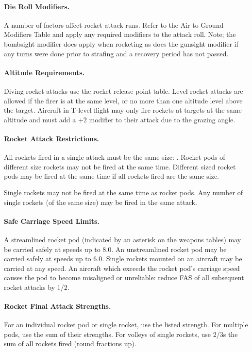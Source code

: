 \paragraph{Die Roll Modifiers.} A number of factors affect rocket attack runs. Refer to the Air to Ground Modifiers Table and apply any required modifiers to the attack roll. Note; the bombsight modifier does apply when rocketing as does the gunsight modifier if any turns were done prior to strafing and a recovery period has not passed.

\paragraph{Altitude Requirements.} Diving rocket attacks use the rocket release point table. Level rocket attacks are allowed if the firer is at the same level, or no more than one altitude level above the target. Aircraft in T-level flight may only fire rockets at targets at the same altitude and must add a +2 modifier to their attack due to the grazing angle.

\paragraph{Rocket Attack Restrictions.} All rockets fired in a single attack must be the same size: . Rocket pods of different size rockets may not be fired at the same time. Different sized rocket pods may be fired at the same time if all rockets fired are the same size.

Single rockets may not be fired at the same time as rocket pods. Any number of single rockets (of the same size) may be fired in the same attack.

\paragraph{Safe Carriage Speed Limits.} A streamlined rocket pod (indicated by an asterisk on the weapons tables) may be carried safely at speeds up to 8.0. An unstreamlined rocket pod may be carried safely at speeds up to 6.0. Single rockets mounted on an aircraft may be carried at any speed. An aircraft which exceeds the rocket pod's carriage speed causes the pod to become misaligned or unreliable: reduce FAS of all subsequent rocket attacks by 1/2.

\paragraph{Rocket Final Attack Strengths.} For an individual rocket pod or single rocket, use the listed strength. For multiple pods, use the sum of their strengths. For volleys of single rockets, use 2/3s the sum of all rockets fired (round fractions up).
